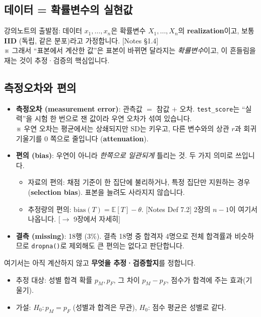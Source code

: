 \documentclass[11pt,a4paper]{article}
\newcommand{\E}{\mathbb{E}}
\newcommand{\term}[1]{\textbf{#1}}
\newcommand{\code}[1]{\texttt{#1}}
\newcommand{\nref}[1]{{\footnotesize\textsf{\color{blue!55!black}[Notes #1]}}}
\newcommand{\aside}[1]{{\footnotesize\color{black!65}#1}}
\newcommand{\fwd}[1]{{\footnotesize\textsf{\color{green!40!black}[$\to$ #1에서 자세히]}}}
\begin{document}
\subsection{데이터 = 확률변수의 실현값}
강의노트의 출발점: 데이터 $x_1,\dots,x_n$은 확률변수 $X_1,\dots,X_n$의 \term{realization}이고, 보통 \term{IID} (독립, 같은 분포)라고 가정합니다. \nref{§1.4}\\
\aside{※ 그래서 ``표본에서 계산한 값''은 표본이 바뀌면 달라지는 \emph{확률변수}이고, 이 흔들림을 재는 것이 추정·검증의 핵심입니다.}

\subsection{측정오차와 편의}
\begin{itemize}
\item \term{측정오차 (measurement error)}: 관측값 $=$ 참값 $+$ 오차. \code{test\_score}는 ``실력''을 시험 한 번으로 잰 값이라 우연 오차가 섞여 있습니다.\\
\aside{※ 우연 오차는 평균에서는 상쇄되지만 SD는 키우고, 다른 변수와의 상관 $r$과 회귀 기울기를 0 쪽으로 줄입니다 (\term{attenuation}).}
\item \term{편의 (bias)}: 우연이 아니라 \emph{한쪽으로 일관되게} 틀리는 것. 두 가지 의미로 쓰입니다.
  \begin{itemize}
  \item 자료의 편의: 채점 기준이 한 집단에 불리하거나, 특정 집단만 지원하는 경우 (\term{selection bias}). 표본을 늘려도 사라지지 않습니다.
  \item 추정량의 편의: $\text{bias}(T)=\E[T]-\theta$. \nref{Def 7.2} 2장의 $n-1$이 여기서 나옵니다. \fwd{9장}
  \end{itemize}
\item \term{결측 (missing)}: 18행 (3\%). 결측 18명 중 합격자 4명으로 전체 합격률과 비슷하므로 \code{dropna()}로 제외해도 큰 편의는 없다고 판단합니다.
\end{itemize}

\begin{hypbox}
여기서는 아직 계산하지 않고 \textbf{무엇을 추정·검증할지}를 정합니다.
\begin{itemize}
\item 추정 대상: 성별 합격 확률 $p_M,p_F$, 그 차이 $p_M-p_F$, 점수가 합격에 주는 효과(기울기).
\item 가설: $H_0: p_M=p_F$ (성별과 합격은 무관), $H_0$: 점수 평균은 성별로 같다.
\end{itemize}
\end{hypbox}
\end{document}

